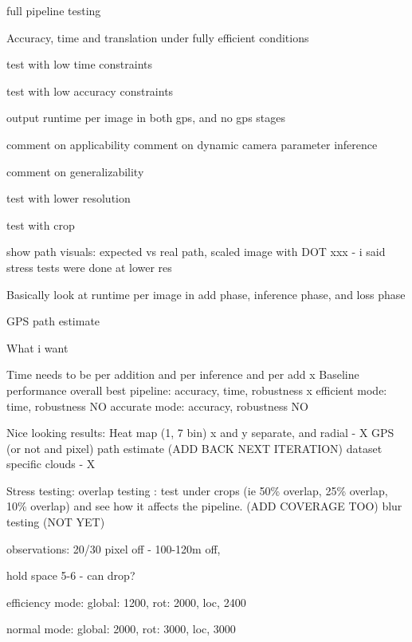 full pipeline testing 

Accuracy, time and translation under fully efficient conditions

test with low time constraints

test with low accuracy constraints

output runtime per image in both gps, and no gps stages



comment on applicability
comment on dynamic camera parameter inference

comment on generalizability




test with lower resolution 

test with crop

show path visuals: expected vs real path, scaled image with DOT 
xxx - i said stress tests were done at lower res



Basically look at runtime per image in add phase, inference phase, and loss phase

GPS path estimate

What i want

Time needs to be per addition and per inference and per add x 
Baseline performance
overall best pipeline: accuracy, time, robustness x
efficient mode: time, robustness NO
accurate mode: accuracy, robustness NO

Nice looking results:
Heat map (1, 7 bin) x and y separate, and radial - X 
GPS (or not and pixel) path estimate (ADD BACK NEXT ITERATION)
dataset specific clouds - X


Stress testing:
overlap testing : test under crops (ie 50\% overlap, 25\% overlap, 10\% overlap) and see how it affects the pipeline. (ADD COVERAGE TOO)
blur testing (NOT YET)


observations:
20/30 pixel off - 100-120m off, 

hold space 5-6 - can drop?





efficiency mode: 
global: 1200, rot: 2000, loc, 2400


normal mode: 
global: 2000, rot: 3000, loc, 3000








